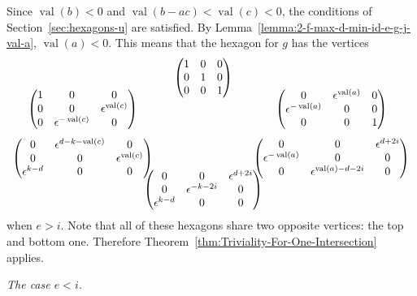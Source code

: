 \documentclass{amsart}
\theoremstyle{definition}
\def\e{\epsilon}
\def\val{\mathop{\mathrm{val}}}
\def\heximagessqueezedcarefully#1#2#3#4#5#6#7#8{
  \begin{array}{ccc}
    & #3 & \\[#2]
    #5 \hspace{-#1} & & \hspace{-#1} #4 \\[2em]
    #6 \hspace{-#1} & & \hspace{-#1} #7 \\[#2]
    & #8 &
  \end{array}
}
\newcommand\subsubsubsection[1]{\vspace{0.5em}\begin{paragraph}{}\noindent \normalfont\large\itshape #1. \end{paragraph}\vspace{0.5em}}
\begin{document}
  Since $\val(b) < 0$ and $\val(b-ac) < \val(c) < 0$, the conditions of
  Section~\ref{sec:hexagons-u} are satisfied.  By
  Lemma~\ref{lemma:2-f-max-d-min-id-e-g-j-val-a}, $\val(a) < 0$.  This means that
  the hexagon for $g$ has the vertices
  \begin{equation*}
   \heximagessqueezedcarefully{1.8em}{-0.8em}
       {\begin{pmatrix}
           1 & 0 & 0 \\ 
           0 & 1 & 0 \\
           0 & 0 & 1
       \end{pmatrix}}
       {\begin{pmatrix}
           0 & \e^{\val(a)} & 0 \\
           \e^{-\val(a)} & 0 & 0 \\
           0 & 0 & 1
       \end{pmatrix}}
       {\begin{pmatrix}
           1 & 0 & 0 \\
           0 & 0 & \e^{\val(c)} \\
           0 & \e^{-\val(c)}  & 0
       \end{pmatrix}}
       {\begin{pmatrix}
           0 & \e^{d-k - \val(c)} & 0 \\
           0 & 0 & \e^{\val(c)} \\
           \e^{k-d} & 0 & 0
       \end{pmatrix}}
       {\begin{pmatrix}
           0 & 0 & \e^{d+2i} \\
           \e^{-\val(a)} & 0 & 0 \\
           0 & \e^{\val(a) - d - 2i} & 0  
       \end{pmatrix}}
       {\begin{pmatrix}
           0 & 0 & \e^{d+2i} \\
           0 & \e^{-k-2i} & 0 \\
           \e^{k-d} & 0 & 0
       \end{pmatrix}}
  \end{equation*}
  when $e > i$.  Note that all of these hexagons share two opposite vertices:
  the top and bottom one.  Therefore
  Theorem~\ref{thm:Triviality-For-One-Intersection} applies.

  \subsubsubsection{The case $e < i$}
\end{document}
